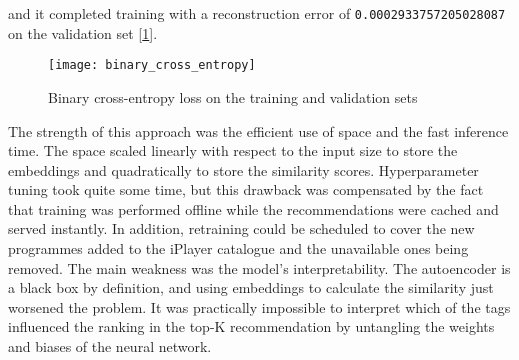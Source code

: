 and it completed training with a reconstruction error of \verb|0.0002933757205028087| on the validation set [\ref{fig:binary_cross_entropy}].

\begin{figure}[H]
  \centering
  \texttt{[image: binary\_cross\_entropy]}
  \caption{Binary cross-entropy loss on the training and validation sets}
  \label{fig:binary_cross_entropy}
\end{figure}

The strength of this approach was the efficient use of space and the fast inference time.
The space scaled linearly with respect to the input size to store the embeddings
and quadratically to store the similarity scores.
Hyperparameter tuning took quite some time, but this drawback was compensated by the fact that training was performed offline
while the recommendations were cached and served instantly.
In addition, retraining could be scheduled to cover the new programmes added to the iPlayer catalogue and the unavailable ones being removed.
The main weakness was the model's interpretability.
The autoencoder is a black box by definition, and using embeddings to calculate the similarity just worsened the problem.
It was practically impossible to interpret which of the tags influenced
the ranking in the top-K recommendation by untangling the weights and biases of the neural network.
